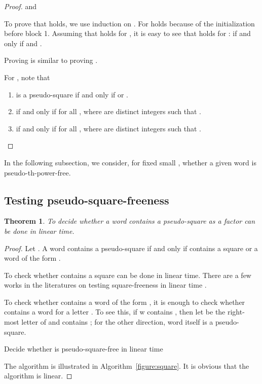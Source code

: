 \documentclass[12pt]{article}
\newtheorem{theorem}{Theorem}
\begin{document}
\begin{proof}
    and
    
    To prove that  holds, we use induction on .
For   holds because of the initialization before block 1.
Assuming that  holds for , it is easy to see that  holds for :
     if and only if  and .

    Proving  is similar to proving .

    For , note that
    \begin{enumerate}
      \item  is a pseudo-square if and only if  or .

      \item  if and only if
         for all
        , where  are distinct integers such that .

      \item  if and only if
         for all
        , where  are distinct integers such that
        .\qedhere
    \end{enumerate}
\end{proof}


In the following subsection, we consider, for fixed small ,
whether a given word  is pseudo-th-power-free.


\subsection{Testing pseudo-square-freeness}
\begin{theorem}
To decide whether a word  contains a pseudo-square as a factor
can be done in linear time.
\end{theorem}
\begin{proof}
Let . A word  contains a pseudo-square if and only if
 contains a square or a word of the form .

To check whether  contains a square can be done in linear time.
There are a few works in the literatures on testing square-freeness
in linear time \cite{Crochemore1983,Main&Lorentz1985}.

To check whether  contains a word of the form , it is
enough to check whether  contains a word  for a letter
. To see this, if w contains , then let  be the
right-most letter of  and  contains ; for the other
direction, word  itself is a pseudo-square.

\begin{algorithm}
  \SetLine {}   
  \linesnumbered
  \;
  \;
  \caption{Decide whether  is pseudo-square-free in linear time}
  \label{figure:square}
\end{algorithm}

The algorithm is illustrated in Algorithm~\ref{figure:square}. It is
obvious that the algorithm is linear.
\end{proof}
\end{document}
